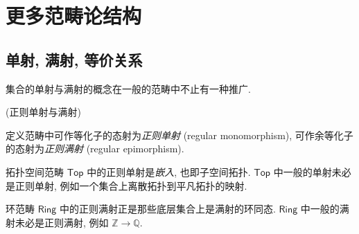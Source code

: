 \section{更多范畴论结构}

\subsection{单射, 满射, 等价关系}



集合的单射与满射的概念在一般的范畴中不止有一种推广.

\begin{definition}
	[label={regular-epi-and-mono}]
	{(正则单射与满射)}
	
	定义范畴中可作等化子的态射为\emph{正则单射} (regular monomorphism), 可作余等化子的态射为\emph{正则满射} (regular epimorphism).
\end{definition}

\begin{example}
	{}
	拓扑空间范畴 $\mathsf {Top}$ 中的正则单射是\emph{嵌入}, 也即子空间拓扑. $\mathsf {Top}$ 中一般的单射未必是正则单射, 例如一个集合上离散拓扑到平凡拓扑的映射.
\end{example}

\begin{example}
	{}
	环范畴 $\mathsf {Ring}$ 中的正则满射正是那些底层集合上是满射的环同态. $\mathsf {Ring}$ 中一般的满射未必是正则满射, 例如 $\mathbb{Z} \to \mathbb{Q}$.
\end{example}



